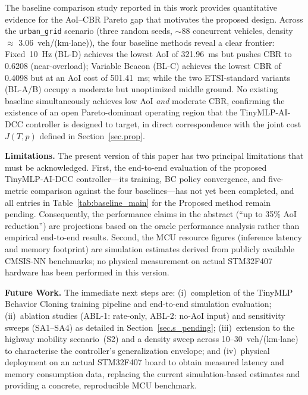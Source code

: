\documentclass[journal]{IEEEtran}
\begin{document}
The baseline comparison study reported in this work provides
quantitative evidence for the AoI--CBR Pareto gap that motivates the
proposed design.  Across the \texttt{urban\_grid} scenario (three
random seeds, $\sim$88 concurrent vehicles, density $\approx$
3.06~veh/(km$\cdot$lane)), the four baseline methods reveal a clear
frontier: Fixed~10~Hz (BL-D) achieves the lowest AoI of 321.96~ms
but pushes CBR to 0.6208 (near-overload); Variable Beacon (BL-C)
achieves the lowest CBR of 0.4098 but at an AoI cost of 501.41~ms;
while the two ETSI-standard variants (BL-A/B) occupy a moderate but
unoptimized middle ground.  No existing baseline simultaneously
achieves low AoI \emph{and} moderate CBR, confirming the existence of
an open Pareto-dominant operating region that the TinyMLP-AI-DCC
controller is designed to target, in direct correspondence with the
joint cost $J(T, p)$ defined in Section~\ref{sec.prop}.

\textbf{Limitations.}  The present version of this paper has two
principal limitations that must be acknowledged.  First, the
end-to-end evaluation of the proposed TinyMLP-AI-DCC controller---its
training, BC policy convergence, and five-metric comparison against
the four baselines---has not yet been completed, and all entries in
Table~\ref{tab:baseline_main} for the Proposed method remain pending.
Consequently, the performance claims in the abstract (``up to 35\%
AoI reduction'') are projections based on the oracle performance
analysis rather than empirical end-to-end results.  Second, the MCU
resource figures (inference latency and memory footprint) are
simulation estimates derived from publicly available CMSIS-NN
benchmarks; no physical measurement on actual STM32F407 hardware has
been performed in this version.

\textbf{Future Work.}
The immediate next steps are: (i)~completion of the TinyMLP Behavior
Cloning training pipeline and end-to-end simulation evaluation;
(ii)~ablation studies (ABL-1: rate-only, ABL-2: no-AoI input) and
sensitivity sweeps (SA1--SA4) as detailed in
Section~\ref{sec.s_pending}; (iii)~extension to the highway mobility
scenario~(S2) and a density sweep across 10--30~veh/(km$\cdot$lane)
to characterise the controller's generalization envelope; and
(iv)~physical deployment on an actual STM32F407 board to obtain
measured latency and memory consumption data, replacing the current
simulation-based estimates and providing a concrete, reproducible MCU
benchmark.
\end{document}
